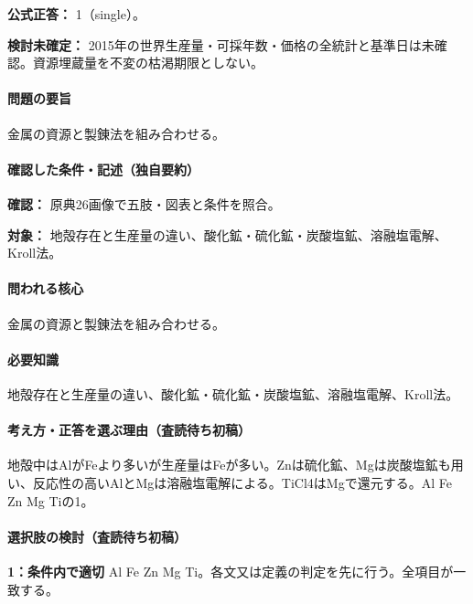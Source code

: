\textbf{公式正答：} 1（single）。

\par\textbf{検討未確定：} 2015年の世界生産量・可採年数・価格の全統計と基準日は未確認。資源埋蔵量を不変の枯渇期限としない。

\paragraph{問題の要旨} 金属の資源と製錬法を組み合わせる。

\paragraph{確認した条件・記述（独自要約）}\mbox{}\par

\noindent\textbf{確認：} 原典26画像で五肢・図表と条件を照合。\par

\noindent\textbf{対象：} 地殻存在と生産量の違い、酸化鉱・硫化鉱・炭酸塩鉱、溶融塩電解、Kroll法。\par

\paragraph{問われる核心} 金属の資源と製錬法を組み合わせる。

\paragraph{必要知識} 地殻存在と生産量の違い、酸化鉱・硫化鉱・炭酸塩鉱、溶融塩電解、Kroll法。

\paragraph{考え方・正答を選ぶ理由（査読待ち初稿）} 地殻中はAlがFeより多いが生産量はFeが多い。Znは硫化鉱、Mgは炭酸塩鉱も用い、反応性の高いAlとMgは溶融塩電解による。TiCl4はMgで還元する。Al Fe Zn Mg Tiの1。

\paragraph{選択肢の検討（査読待ち初稿）}\mbox{}\par

\noindent\textbf{1：条件内で適切} Al Fe Zn Mg Ti。各文又は定義の判定を先に行う。全項目が一致する。\par

